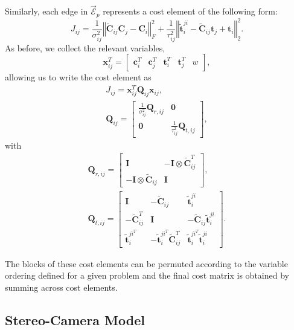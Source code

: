 \documentclass[lettersize,journal]{IEEEtran}
\newcommand{\EdgeSet}{\vec{\bm{\mathcal{E}}}}
\begin{document}
Similarly, each edge in $\EdgeSet_p$ represents a cost element of the following form:
\begin{equation}
	J_{ij} = \frac{1}{\sigma^2_{ij}} \left\Vert \tilde{\bm{C}}_{ij}\bm{C}_j - \bm{C}_i\right\Vert_F^2 + \frac{1}{\tau^2_{ij}} \left\Vert \tilde{\bm{t}}^{ji}_{i} - \tilde{\bm{C}}_{ij}\bm{t}_j + \bm{t}_i \right\Vert_2^2.
\end{equation}
As before, we collect the relevant variables,
\begin{equation*}
	\bm{x}_{ij}^T = \begin{bmatrix} \bm{c}_i^T&\bm{c}_j^T  & \bm{t}_i^T & \bm{t}_j^T & w\end{bmatrix},
\end{equation*}
allowing us to write the cost element as
\begin{gather*}
	J_{ij}= \bm{x}_{ij}^T\bm{Q}_{ij}\bm{x}_{ij}, \\
	\bm{Q}_{ij} = \begin{bmatrix}
		\frac{1}{\sigma^2_{ij}}\bm{Q}_{r,ij} & \bm{0}\\
		\bm{0}&\frac{1}{\tau^2_{ij}}\bm{Q}_{t,ij}
	\end{bmatrix},
\end{gather*}
with
\begin{gather*}
	\bm{Q}_{r,ij}=\begin{bmatrix}
		\bm{I}  &  -\bm{I}\otimes\tilde{\bm{C}}_{ij}^T\\
		-\bm{I}\otimes\tilde{\bm{C}}_{ij} & \bm{I}
	\end{bmatrix}, \\ 
	\bm{Q}_{t,ij}=\begin{bmatrix}
		\bm{I}  &  -\tilde{\bm{C}}_{ij} & \tilde{\bm{t}}_{i}^{ji}\\
		-\tilde{\bm{C}}_{ij}^T & \bm{I} & -\tilde{\bm{C}}_{ij}\tilde{\bm{t}}_{i}^{ji}\\
		\tilde{\bm{t}}_{i}^{ji^T} &  -\tilde{\bm{t}}_{i}^{ji^T}\tilde{\bm{C}}_{ij}^T & \tilde{\bm{t}}_{i}^{ji^T} \tilde{\bm{t}}_{i}^{ji}
	\end{bmatrix}.
\end{gather*}

The blocks of these cost elements can be permuted according to the variable ordering defined for a given problem and the final cost matrix is obtained by summing across cost elements.


\subsection{Stereo-Camera Model}\label{SM:stereo}
\end{document}
